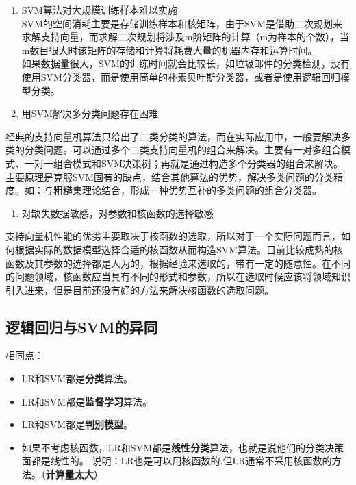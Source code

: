 \begin{enumerate}
\def\labelenumi{(\arabic{enumi})}
\item
  SVM算法对大规模训练样本难以实施\\
  ​
  SVM的空间消耗主要是存储训练样本和核矩阵，由于SVM是借助二次规划来求解支持向量，而求解二次规划将涉及m阶矩阵的计算（m为样本的个数），当m数目很大时该矩阵的存储和计算将耗费大量的机器内存和运算时间。\\
  ​
  如果数据量很大，SVM的训练时间就会比较长，如垃圾邮件的分类检测，没有使用SVM分类器，而是使用简单的朴素贝叶斯分类器，或者是使用逻辑回归模型分类。
\item
  用SVM解决多分类问题存在困难
\end{enumerate}

​
经典的支持向量机算法只给出了二类分类的算法，而在实际应用中，一般要解决多类的分类问题。可以通过多个二类支持向量机的组合来解决。主要有一对多组合模式、一对一组合模式和SVM决策树；再就是通过构造多个分类器的组合来解决。主要原理是克服SVM固有的缺点，结合其他算法的优势，解决多类问题的分类精度。如：与粗糙集理论结合，形成一种优势互补的多类问题的组合分类器。

\begin{enumerate}
\def\labelenumi{(\arabic{enumi})}
\setcounter{enumi}{2}
\item
  对缺失数据敏感，对参数和核函数的选择敏感
\end{enumerate}

​
支持向量机性能的优劣主要取决于核函数的选取，所以对于一个实际问题而言，如何根据实际的数据模型选择合适的核函数从而构造SVM算法。目前比较成熟的核函数及其参数的选择都是人为的，根据经验来选取的，带有一定的随意性。在不同的问题领域，核函数应当具有不同的形式和参数，所以在选取时候应该将领域知识引入进来，但是目前还没有好的方法来解决核函数的选取问题。

\subsection{逻辑回归与SVM的异同}\label{ux903bux8f91ux56deux5f52ux4e0esvmux7684ux5f02ux540c}

相同点：

\begin{itemize}
\item
  LR和SVM都是\textbf{分类}算法。
\item
  LR和SVM都是\textbf{监督学习}算法。
\item
  LR和SVM都是\textbf{判别模型}。
\item
  如果不考虑核函数，LR和SVM都是\textbf{线性分类}算法，也就是说他们的分类决策面都是线性的。
  说明：LR也是可以用核函数的.但LR通常不采用核函数的方法。（\textbf{计算量太大}）
\end{itemize}

